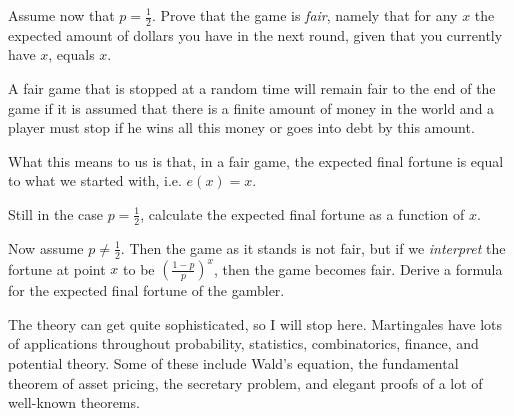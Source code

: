 \documentclass{article}
\begin{document}
\begin{exercise}
Assume now that $p=\frac{1}{2}$. Prove that the game is \emph{fair}, namely that for any $x$ the expected amount of dollars you have in the next round, given that you currently have $x$, equals $x$. 
\end{exercise}

\begin{theorem}
A fair game that is stopped at a random time will remain fair to the end of the game if it is assumed that there is a finite amount of money in the world and a player must stop if he wins all this money or goes into debt by this amount.
\end{theorem}

What this means to us is that, in a fair game, the expected final fortune is equal to what we started with, i.e. $e(x)=x$. 

\begin{exercise}
Still in the case $p=\frac{1}{2}$, calculate the expected final fortune as a function of $x$.
\end{exercise}

\begin{exercise}
Now assume $p\neq \frac{1}{2}$. Then the game as it stands is not fair, but if we \emph{interpret} the fortune at point $x$ to be $(\frac{1-p}{p})^x$, then the game becomes fair. Derive a formula for the expected final fortune of the gambler.
\end{exercise}

\begin{remark}
The theory can get quite sophisticated, so I will stop here. Martingales have lots of applications throughout probability, statistics, combinatorics, finance, and potential theory. Some of these include Wald's equation, the fundamental theorem of asset pricing, the secretary problem, and elegant proofs of a lot of well-known theorems. 
\end{remark}
\end{document}
